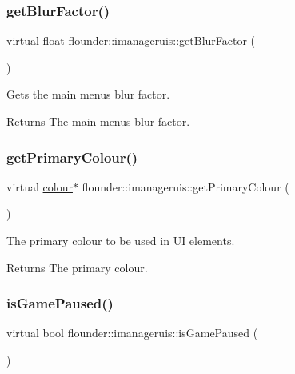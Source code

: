 \subsubsection{\texorpdfstring{get\+Blur\+Factor()}{getBlurFactor()}}
{\footnotesize\ttfamily virtual float flounder\+::imanageruis\+::get\+Blur\+Factor (\begin{DoxyParamCaption}{ }\end{DoxyParamCaption})\hspace{0.3cm}{\ttfamily [pure virtual]}}



Gets the main menu\textquotesingle{}s blur factor. 

\begin{DoxyReturn}{Returns}
The main menu\textquotesingle{}s blur factor. 
\end{DoxyReturn}
\mbox{\label{classflounder_1_1imanageruis_add2f4d36a50adc177088f3a56c23a91a}} 
\subsubsection{\texorpdfstring{get\+Primary\+Colour()}{getPrimaryColour()}}
{\footnotesize\ttfamily virtual \hyperlink{classflounder_1_1colour}{colour}$\ast$ flounder\+::imanageruis\+::get\+Primary\+Colour (\begin{DoxyParamCaption}{ }\end{DoxyParamCaption})\hspace{0.3cm}{\ttfamily [pure virtual]}}



The primary colour to be used in UI elements. 

\begin{DoxyReturn}{Returns}
The primary colour. 
\end{DoxyReturn}
\mbox{\label{classflounder_1_1imanageruis_ad79a86978a96901e62ced2e0e0f09af3}} 
\subsubsection{\texorpdfstring{is\+Game\+Paused()}{isGamePaused()}}
{\footnotesize\ttfamily virtual bool flounder\+::imanageruis\+::is\+Game\+Paused (\begin{DoxyParamCaption}{ }\end{DoxyParamCaption})\hspace{0.3cm}{\ttfamily [pure virtual]}}



